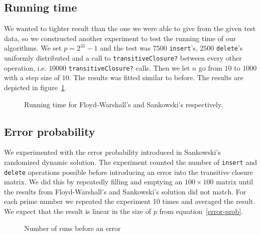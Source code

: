 \documentclass[a4paper,oneside,article,11pt]{memoir}
\begin{document}
\subsection{Running time}
We wanted to tighter result than the one we were able to give from the given test data, so we constructed another experiment to test the running time of our algorithms. We set $p=2^{31}-1$ and the test was $7500$ \texttt{insert}'s, $2500$ \texttt{delete}'s uniformly distributed and a call to \texttt{transitiveClosure?} between every other operation, i.e. $10000$ \texttt{transitiveClosure?} calls. Then we let $n$ go from $10$ to $1000$ with a step size of $10$. The results was fitted similar to before. The results are depicted in figure~\ref{fig:running}.

\begin{figure}[ht]
\caption{Running time for Floyd-Warshall's and Sankowski's respectively.}
\label{fig:running}
\end{figure}

\subsection{Error probability}
We experimented with the error probability introduced in Sankowski's randomized dynamic solution. The experiment counted the number of \texttt{insert} and \texttt{delete} operations possible before introducing an error into the transitive closure matrix. We did this by repeatedly filling and emptying an $100 \times 100$ matrix until the results from Floyd-Warshall's and Sankowski's solution did not match. For each prime number we repeated the experiment 10 times and averaged the result. We expect that the result is linear in the size of $p$ from equation~\ref{error-prob}.
\begin{figure}[ht]
\caption{Number of runs before an error}
\label{fig:num-runs}
\end{figure}


\end{document}
